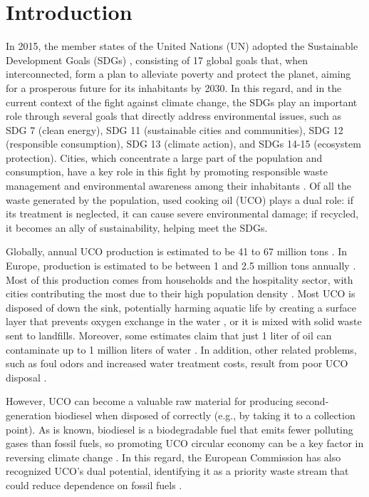 \section{Introduction}
\label{introduction}
In 2015, the member states of the United Nations (UN) adopted the Sustainable Development Goals (SDGs) \cite{UN_SDGs_2024}, consisting of 17 global goals that, when interconnected, form a plan to alleviate poverty and protect the planet, aiming for a prosperous future for its inhabitants by 2030. In this regard, and in the current context of the fight against climate change, the SDGs play an important role through several goals that directly address environmental issues, such as SDG 7 (clean energy), SDG 11 (sustainable cities and communities), SDG 12 (responsible consumption), SDG 13 (climate action), and SDGs 14-15 (ecosystem protection). Cities, which concentrate a large part of the population and consumption, have a key role in this fight by promoting responsible waste management and environmental awareness among their inhabitants \cite{mi2019cities}. Of all the waste generated by the population, used cooking oil (UCO) plays a dual role: if its treatment is neglected, it can cause severe environmental damage; if recycled, it becomes an ally of sustainability, helping meet the SDGs. 

Globally, annual UCO production is estimated to be 41 to 67 million tons \cite{kumar2025valorization}. In Europe, production is estimated to be between 1 and 2.5 million tons annually \cite{mannu2025sustainable}. Most of this production comes from households and the hospitality sector, with cities contributing the most due to their high population density \cite{wan2019waste}. Most UCO is disposed of down the sink, potentially harming aquatic life by creating a surface layer that prevents oxygen exchange in the water \cite{tamothran2022degradation}, or it is mixed with solid waste sent to landfills. Moreover, some estimates claim that just 1 liter of oil can contaminate up to 1 million liters of water \cite{kumar2015transformation}. In addition, other related problems, such as foul odors and increased water treatment costs, result from poor UCO disposal \cite{orjuela2020green}.

However, UCO can become a valuable raw material for producing second-generation biodiesel when disposed of correctly (e.g., by taking it to a collection point). As is known, biodiesel is a biodegradable fuel that emits fewer polluting gases than fossil fuels, so promoting UCO circular economy can be a key factor in reversing climate change \cite{firoz2017review}. In this regard, the European Commission has also recognized UCO's dual potential, identifying it as a priority waste stream that could reduce dependence on fossil fuels  \cite{tamothran2022degradation}.

